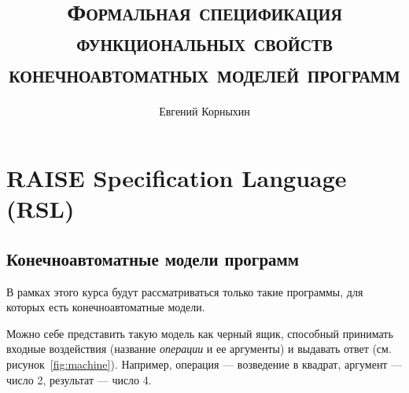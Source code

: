 \documentclass[14pt, twoside]{extreport}
\author{Евгений Корныхин}
\title{\huge{\textbf{\textsc{Формальная спецификация функциональных свойств конечноавтоматных моделей программ}}}}
\begin{document}
\maketitle

\tableofcontents





\chapter{RAISE Specification Language (RSL)}

\section{Конечноавтоматные модели программ}

В рамках этого курса будут рассматриваться только такие программы, для которых есть конечноавтоматные модели.

Можно себе представить такую модель как черный ящик, способный принимать входные воздействия (название \emph{операции} и ее аргументы) и выдавать ответ (см. рисунок~\ref{fig:machine}). Например, операция --- возведение в квадрат, аргумент --- число 2, результат --- число 4. 
\end{document}
